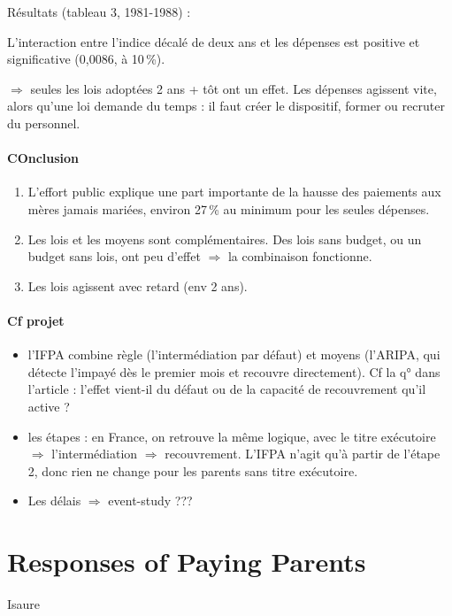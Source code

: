 \documentclass{article}
\begin{document}
\medskip
\noindent Résultats (tableau 3, 1981-1988) :
 
\noindent L'interaction entre l'indice décalé de deux ans et les dépenses est positive et significative (0,0086, à 10\,\%).
 
\noindent $\Rightarrow$ seules les lois adoptées 2 ans + tôt ont un effet. Les dépenses agissent vite, alors qu'une loi demande du temps : il faut créer le dispositif, former ou recruter du personnel.
 
\paragraph{COnclusion}
\begin{enumerate}
    \item L'effort public explique une part importante de la hausse des paiements aux mères jamais mariées, environ 27\,\% au minimum pour les seules dépenses.
    \item Les lois et les moyens sont complémentaires. Des lois sans budget, ou un budget sans lois, ont peu d'effet $\Rightarrow$ la combinaison fonctionne.
    \item Les lois agissent avec retard (env 2 ans).
\end{enumerate}
 
\paragraph{Cf projet}
\begin{itemize}
    \item l'IFPA combine règle (l'intermédiation par défaut) et moyens (l'ARIPA, qui détecte l'impayé dès le premier mois et recouvre directement). Cf la q° dans l'article : l'effet vient-il du défaut ou de la capacité de recouvrement qu'il active ?
    \item les étapes : en France, on retrouve la même logique, avec le titre exécutoire $\Rightarrow$ l'intermédiation $\Rightarrow$ recouvrement. L'IFPA n'agit qu'à partir de l'étape 2, donc rien ne change pour les parents sans titre exécutoire.
    \item Les délais $\Rightarrow$ event-study ???
\end{itemize}




\section{Responses of Paying Parents}
Isaure
\end{document}
